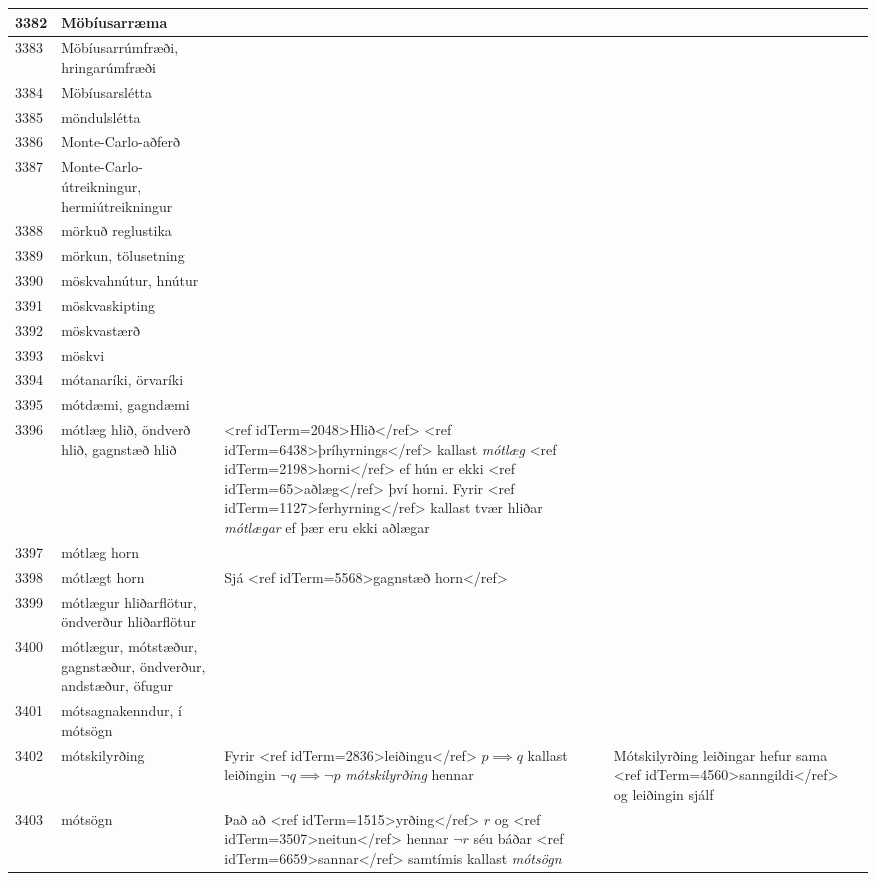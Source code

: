 \begin{longtable}{p{}|p{}|p{}|p{}|p{}}
3382 & Möbíusarræma &  &  &  \\
\hline
3383 & Möbíusarrúmfræði, hringarúmfræði &  &  &  \\
\hline
3384 & Möbíusarslétta &  &  &  \\
\hline
3385 & möndulslétta &  &  &  \\
\hline
3386 & Monte-Carlo-aðferð &  &  &  \\
\hline
3387 & Monte-Carlo-útreikningur, hermiútreikningur &  &  &  \\
\hline
3388 & mörkuð reglustika &  &  &  \\
\hline
3389 & mörkun, tölusetning &  &  &  \\
\hline
3390 & möskvahnútur, hnútur &  &  &  \\
\hline
3391 & möskvaskipting &  &  &  \\
\hline
3392 & möskvastærð &  &  &  \\
\hline
3393 & möskvi &  &  &  \\
\hline
3394 & mótanaríki, örvaríki &  &  &  \\
\hline
3395 & mótdæmi, gagndæmi &  &  &  \\
\hline
3396 & mótlæg hlið, öndverð hlið, gagnstæð hlið & <ref idTerm=2048>Hlið</ref> <ref idTerm=6438>þríhyrnings</ref> kallast \textit{mótlæg} <ref idTerm=2198>horni</ref> ef hún er ekki <ref idTerm=65>aðlæg</ref> því horni. Fyrir <ref idTerm=1127>ferhyrning</ref> kallast tvær hliðar \textit{mótlægar} ef þær eru ekki aðlægar &  & \\
\hline
3397 & mótlæg horn &  &  &  \\
\hline
3398 & mótlægt horn & Sjá <ref idTerm=5568>gagnstæð horn</ref> &  &  \\
\hline
3399 & mótlægur hliðarflötur, öndverður hliðarflötur &  &  &  \\
\hline
3400 & mótlægur, mótstæður, gagnstæður, öndverður, andstæður, öfugur &  &  &  \\
\hline
3401 & mótsagnakenndur, í mótsögn &  &  &  \\
\hline
3402 & mótskilyrðing & Fyrir <ref idTerm=2836>leiðingu</ref> $p \implies q$ kallast leiðingin $\lnot q \implies \lnot p$ \textit{mótskilyrðing} hennar & Mótskilyrðing leiðingar hefur sama <ref idTerm=4560>sanngildi</ref> og leiðingin sjálf &  \\
\hline
3403 & mótsögn & Það að <ref idTerm=1515>yrðing</ref> $r$ og <ref idTerm=3507>neitun</ref> hennar $\lnot r$ séu báðar <ref idTerm=6659>sannar</ref> samtímis kallast \textit{mótsögn} &  &  \\

\end{longtable}
